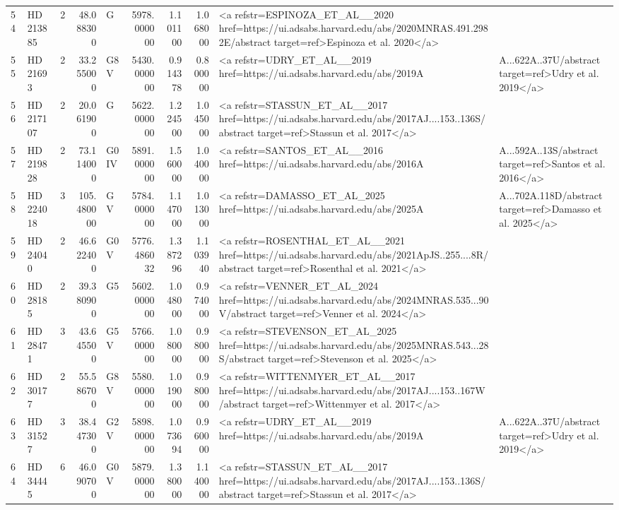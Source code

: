 \begin{tabular}{llrrlrrrl}
54 & HD 213885 & 2 & 48.088300 & G & 5978.000000 & 1.101100 & 1.068000 & <a refstr=ESPINOZA_ET_AL__2020 href=https://ui.adsabs.harvard.edu/abs/2020MNRAS.491.2982E/abstract target=ref>Espinoza et al. 2020</a> \\
55 & HD 21693 & 2 & 33.255000 & G8 V & 5430.000000 & 0.914378 & 0.800000 & <a refstr=UDRY_ET_AL__2019 href=https://ui.adsabs.harvard.edu/abs/2019A&A...622A..37U/abstract target=ref>Udry et al. 2019</a> \\
56 & HD 217107 & 2 & 20.061900 & G & 5622.000000 & 1.224500 & 1.045000 & <a refstr=STASSUN_ET_AL__2017 href=https://ui.adsabs.harvard.edu/abs/2017AJ....153..136S/abstract target=ref>Stassun et al. 2017</a> \\
57 & HD 219828 & 2 & 73.114000 & G0 IV & 5891.000000 & 1.560000 & 1.040000 & <a refstr=SANTOS_ET_AL__2016 href=https://ui.adsabs.harvard.edu/abs/2016A&A...592A..13S/abstract target=ref>Santos et al. 2016</a> \\
58 & HD 224018 & 3 & 105.480000 & G V & 5784.000000 & 1.147000 & 1.013000 & <a refstr=DAMASSO_ET_AL_2025 href=https://ui.adsabs.harvard.edu/abs/2025A&A...702A.118D/abstract target=ref>Damasso et al. 2025</a> \\
59 & HD 24040 & 2 & 46.622400 & G0 V & 5776.486032 & 1.387296 & 1.103940 & <a refstr=ROSENTHAL_ET_AL__2021 href=https://ui.adsabs.harvard.edu/abs/2021ApJS..255....8R/abstract target=ref>Rosenthal et al. 2021</a> \\
60 & HD 28185 & 2 & 39.380900 & G5 & 5602.000000 & 1.048000 & 0.974000 & <a refstr=VENNER_ET_AL_2024 href=https://ui.adsabs.harvard.edu/abs/2024MNRAS.535...90V/abstract target=ref>Venner et al. 2024</a> \\
61 & HD 28471 & 3 & 43.645500 & G5 V & 5766.000000 & 1.080000 & 0.980000 & <a refstr=STEVENSON_ET_AL_2025 href=https://ui.adsabs.harvard.edu/abs/2025MNRAS.543...28S/abstract target=ref>Stevenson et al. 2025</a> \\
62 & HD 30177 & 2 & 55.586700 & G8 V & 5580.000000 & 1.019000 & 0.980000 & <a refstr=WITTENMYER_ET_AL__2017 href=https://ui.adsabs.harvard.edu/abs/2017AJ....153..167W/abstract target=ref>Wittenmyer et al. 2017</a> \\
63 & HD 31527 & 3 & 38.447300 & G2 V & 5898.000000 & 1.073694 & 0.960000 & <a refstr=UDRY_ET_AL__2019 href=https://ui.adsabs.harvard.edu/abs/2019A&A...622A..37U/abstract target=ref>Udry et al. 2019</a> \\
64 & HD 34445 & 6 & 46.090700 & G0 V & 5879.000000 & 1.380000 & 1.140000 & <a refstr=STASSUN_ET_AL__2017 href=https://ui.adsabs.harvard.edu/abs/2017AJ....153..136S/abstract target=ref>Stassun et al. 2017</a> \\

\end{tabular}
